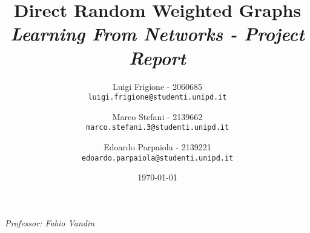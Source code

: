 \title{
    \textbf{Direct Random Weighted Graphs}\\[.5cm]
    
    {\large\emph{Learning From Networks - Project Report}}
}

\author{
  Luigi Frigione - 2060685\\
  \texttt{\small{luigi.frigione@studenti.unipd.it}}
  \and
  Marco Stefani - 2139662\\
  \texttt{\small{marco.stefani.3@studenti.unipd.it}}
  \and
  Edoardo Parpaiola - 2139221\\
  \texttt{\small{edoardo.parpaiola@studenti.unipd.it}}
}

\date{\today}

\maketitle

\tableofcontents

\vfill
{
    \emph{Professor: Fabio Vandin}
}
